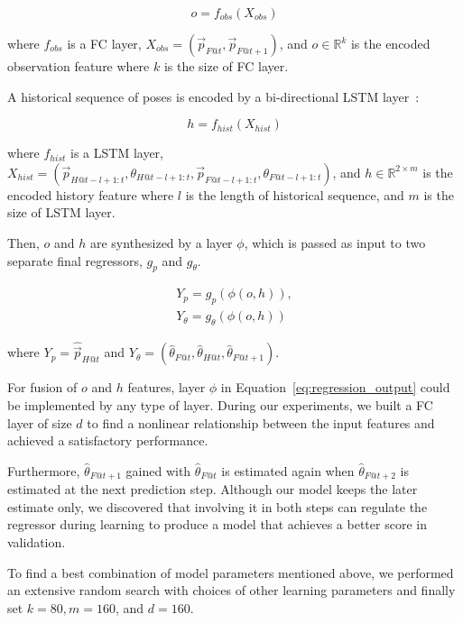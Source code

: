 \documentclass[letterpaper, 10 pt, conference]{ieeeconf}  %
\begin{document}
	\begin{equation}
	o = f_{obs}(X_{obs})
	\end{equation}

	where $f_{obs}$ is a FC layer,
		$X_{obs} = (\vec{p}_{F@t}, \vec{p}_{F@t+1})$,
		and $o \in \mathbb{R}^{k}$ is the encoded observation feature
		where $k$ is the size of FC layer.

	A historical sequence of poses is encoded by a bi-directional LSTM layer~\cite{Wu16}:

	\begin{equation}
	h = f_{hist}(X_{hist})
	\end{equation}


     where $f_{hist}$ is a LSTM layer,
		$X_{hist} = (\vec{p}_{H@t-l+1:t}, \theta_{H@t-l+1:t},
		             \vec{p}_{F@t-l+1:t}, \theta_{F@t-l+1:t})$,
		and $h \in \mathbb{R}^{2 \times m}$ is the encoded history feature
	where $l$ is the length of historical sequence,
	and $m$ is the size of LSTM layer.

	Then, $o$ and $h$ are synthesized by a layer $\phi$, which is
	passed as input to two separate final regressors, $g_{p}$ and $g_\theta$.

	\begin{equation}
	\begin{split}
	Y_{p} = g_{p}(\phi(o, h)),\\
	Y_{\theta}= g_{\theta}(\phi(o, h))
	\end{split}
	\label{eq:regression_output}
	\end{equation}

	where
	$Y_{p} = \hat{\vec{p}}_{H@t}$ and
	$Y_{\theta} = (\hat{\theta}_{F@t}, \hat{\theta}_{H@t}, \hat{\theta}_{F@t+1})$.

	For fusion of $o$ and $h$ features, layer $\phi$ in Equation~\ref{eq:regression_output}
	could be implemented by any type of layer. During our experiments, we
	built a FC layer of size $d$ to find a nonlinear relationship between the input
	features and achieved a satisfactory performance.

	Furthermore, $\hat{\theta}_{F@t+1}$ gained with $\hat{\theta}_{F@t}$ is
	estimated again when $\hat{\theta}_{F@t+2}$ is estimated at the next
	prediction step. Although our model keeps the later estimate only,
	we discovered that involving it in both steps can regulate the regressor
	during learning to produce a model that achieves a better score in validation.

	To find a best combination of model parameters mentioned above, we performed
	an extensive random search with choices of other learning parameters and
	finally set $k=80, m=160$, and $d=160$.
\end{document}
